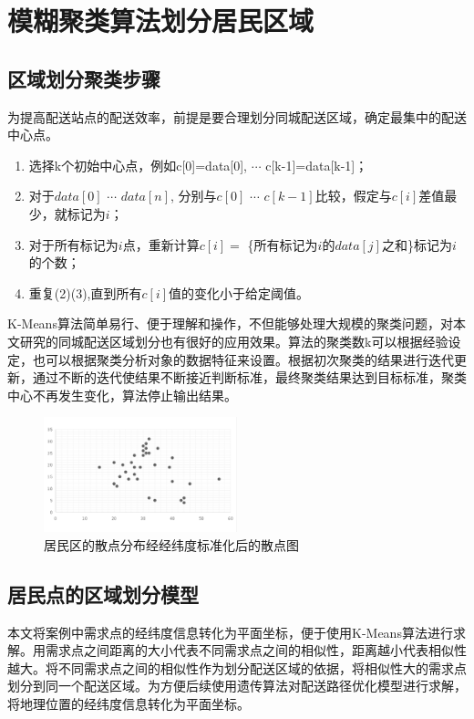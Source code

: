 \clearpage
\setcounter{equation}{0}
\section{模糊聚类算法划分居民区域}
\subsection{区域划分聚类步骤}
为提高配送站点的配送效率，前提是要合理划分同城配送区域，确定最集中的配送中心点。

\begin{enumerate}
    \item 选择\rm{k}个初始中心点，例如\rm{c[0]=data[0]}, $\cdots$ \rm{c[k-1]=data[k-1]}；
    \item 对于$data[0]$ $\cdots$ $data[n]$, 分别与$c[0]$ $\cdots$ $c[k-1]$比较，假定与$c[i]$差值最少，就标记为$i$；
    \item 对于所有标记为$i$点，重新计算$c[i]=$ \{所有标记为$i$的$data[j]$之和\}标记为$i$的个数；
    \item 重复(2)(3),直到所有$c[i]$值的变化小于给定阈值。
\end{enumerate}

K-Means算法简单易行、便于理解和操作，不但能够处理大规模的聚类问题，对本文研究的同城配送区域划分也有很好的应用效果。算法的聚类数k可以根据经验设定，也可以根据聚类分析对象的数据特征来设置。根据初次聚类的结果进行迭代更新，通过不断的迭代使结果不断接近判断标准，最终聚类结果达到目标标准，聚类中心不再发生变化，算法停止输出结果。

 \begin{figure}[h]
     \centering
     \includegraphics[width=0.5\textwidth]{fig3/fig31.png}
     \caption{居民区的散点分布经经纬度标准化后的散点图}
     \label{fig:my_label}
 \end{figure}
\FloatBarrier
\subsection{居民点的区域划分模型}
\par 本文将案例中需求点的经纬度信息转化为平面坐标，便于使用\rm{K-Means}算法进行求解。用需求点之间距离的大小代表不同需求点之间的相似性，距离越小代表相似性越大。将不同需求点之间的相似性作为划分配送区域的依据，将相似性大的需求点划分到同一个配送区域。为方便后续使用遗传算法对配送路径优化模型进行求解，将地理位置的经纬度信息转化为平面坐标。

